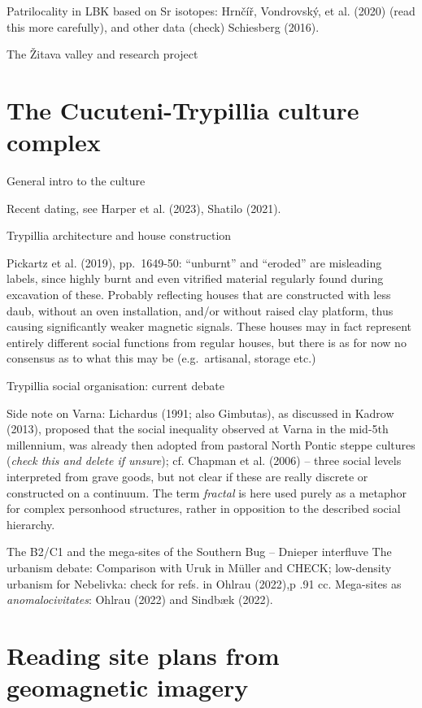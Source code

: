 \documentclass[
  12pt,
]{book}
\begin{document}
Patrilocality in LBK based on Sr isotopes: Hrnčíř, Vondrovský, et al. (2020) (read this more carefully), and other data (check) Schiesberg (2016).

The Žitava valley and research project

\hypertarget{trypillia}{%
\section{The Cucuteni-Trypillia culture complex}\label{trypillia}}

General intro to the culture

Recent dating, see Harper et al. (2023), Shatilo (2021).

Trypillia architecture and house construction

Pickartz et al. (2019), pp.~1649-50: ``unburnt'' and ``eroded'' are misleading labels, since highly burnt and even vitrified material regularly found during excavation of these. Probably reflecting houses that are constructed with less daub, without an oven installation, and/or without raised clay platform, thus causing significantly weaker magnetic signals. These houses may in fact represent entirely different social functions from regular houses, but there is as for now no consensus as to what this may be (e.g.~artisanal, storage etc.)

Trypillia social organisation: current debate

Side note on Varna: Lichardus (1991; also Gimbutas), as discussed in Kadrow (2013), proposed that the social inequality observed at Varna in the mid-5th millennium, was already then adopted from pastoral North Pontic steppe cultures (\emph{check this and delete if unsure}); cf. Chapman et al. (2006) -- three social levels interpreted from grave goods, but not clear if these are really discrete or constructed on a continuum. The term \emph{fractal} is here used purely as a metaphor for complex personhood structures, rather in opposition to the described social hierarchy.

The B2/C1 and the mega-sites of the Southern Bug -- Dnieper interfluve The urbanism debate: Comparison with Uruk in Müller and CHECK; low-density urbanism for Nebelivka: check for refs. in Ohlrau (2022),p .91 cc. Mega-sites as \emph{anomalocivitates}: Ohlrau (2022) and Sindbæk (2022).

\hypertarget{reading-site-plans-from-geomagnetic-imagery}{%
\section{Reading site plans from geomagnetic imagery}\label{reading-site-plans-from-geomagnetic-imagery}}
\end{document}

